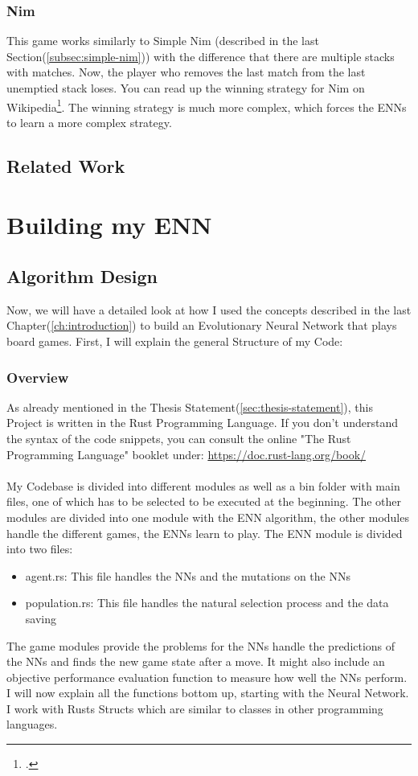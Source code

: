 \documentclass[11pt]{report}
\begin{document}
\begin{enumerate}
    \subsection{Nim}\label{subsec:nim}
    This game works similarly to Simple Nim (described in the last Section(\ref{subsec:simple-nim})) with the difference that there are multiple stacks with matches.
    Now, the player who removes the last match from the last unemptied stack loses.
    You can read up the winning strategy for Nim on Wikipedia\footcite{nim_23}.
    The winning strategy is much more complex, which forces the ENNs to learn a more complex strategy.
    \section{Related Work}\label{sec:related-work}


    \chapter{Building my ENN}\label{ch:building-my-enn}


    \section{Algorithm Design}\label{sec:algorithm-design}
    Now, we will have a detailed look at how I used the concepts described in the last Chapter(\ref{ch:introduction}) to build an Evolutionary Neural Network that plays board games.
    First, I will explain the general Structure of my Code:
        \subsection{Overview}\label{subsec:overview}
    As already mentioned in the Thesis Statement(\ref{sec:thesis-statement}), this Project is written in the Rust Programming Language.
    If you don't understand the syntax of the code snippets, you can consult the online "The Rust Programming Language" booklet under: \url{https://doc.rust-lang.org/book/}
    \\ \\
    My Codebase is divided into different modules as well as a bin folder with main files, one of which has to be selected to be executed at the beginning.
    The other modules are divided into one module with the ENN algorithm, the other modules handle the different games, the ENNs learn to play.
    The ENN module is divided into two files:
    \begin{itemize}
        \item agent.rs: This file handles the NNs and the mutations on the NNs
        \item population.rs: This file handles the natural selection process and the data saving
    \end{itemize}
    The game modules provide the problems for the NNs handle the predictions of the NNs and finds the new game state after a move.
    It might also include an objective performance evaluation function to measure how well the NNs perform.
    I will now explain all the functions bottom up, starting with the Neural Network.
    I work with Rusts Structs which are similar to classes in other programming languages.

\end{enumerate}
\end{document}
